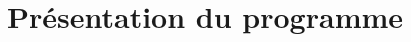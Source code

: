 \documentclass[a4paper, 11pt]{article} %
\begin{document}
\maketitle %




\cleardoublepage
\section*{Présentation du programme}


\cleardoublepage


\cleardoublepage



\cleardoublepage



\end{document}
